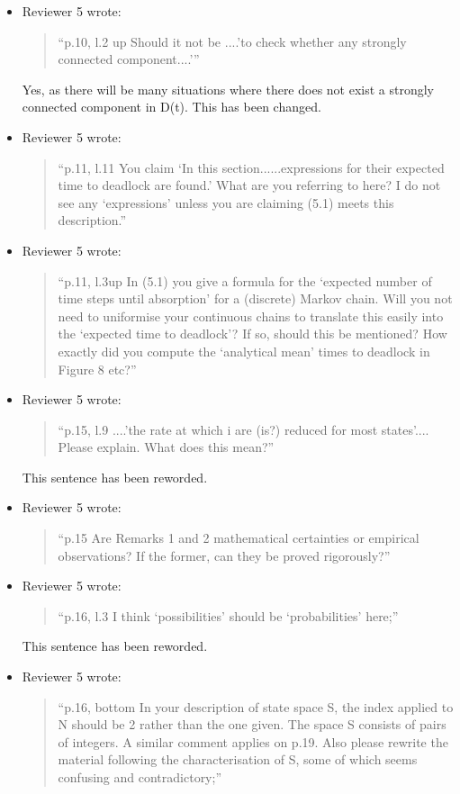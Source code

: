 \documentclass{article}
\begin{document}
\begin{itemize}
\item Reviewer 5 wrote:
\begin{quote}
``p.10, l.2 up Should it not be ....’to check whether any strongly connected
component....’''
\end{quote}

Yes, as there will be many situations where there does not exist a strongly
connected component in D(t). This has been changed.


\item Reviewer 5 wrote:
\begin{quote}
``p.11, l.11 You claim ‘In this section......expressions for their expected time
to deadlock are found.’ What are you referring to here? I do not see any
‘expressions’ unless you are claiming (5.1) meets this description.''
\end{quote}


\item Reviewer 5 wrote:
\begin{quote}
``p.11, l.3up In (5.1) you give a formula for the ‘expected number of time steps
until absorption’ for a (discrete) Markov chain. Will you not need to uniformise
your continuous chains to translate this easily into the ‘expected time to
deadlock’? If so, should this be mentioned? How exactly did you compute the
‘analytical mean’ times to deadlock in Figure 8 etc?''
\end{quote}

\item Reviewer 5 wrote:
\begin{quote}
``p.15, l.9 ....’the rate at which i are (is?) reduced for most states’....
Please explain. What does this mean?''
\end{quote}

This sentence has been reworded.


\item Reviewer 5 wrote:
\begin{quote}
``p.15 Are Remarks 1 and 2 mathematical certainties or empirical observations?
If the former, can they be proved rigorously?''
\end{quote}

\item Reviewer 5 wrote:
\begin{quote}
``p.16, l.3 I think ‘possibilities’ should be ‘probabilities’ here;''
\end{quote}

This sentence has been reworded.


\item Reviewer 5 wrote:
\begin{quote}
``p.16, bottom In your description of state space S, the index applied to N
should be 2 rather than the one given. The space S consists of pairs of
integers. A similar comment applies on p.19. Also please rewrite the material
following the characterisation of S, some of which seems confusing and
contradictory;''
\end{quote}



\end{itemize}
\end{document}
